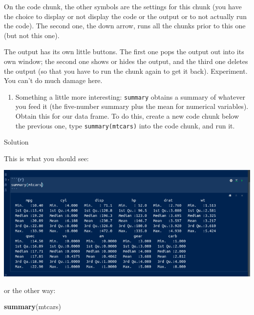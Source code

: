 \documentclass[]{tufte-book}
\newenvironment{Shaded}{}{}
\newcommand{\KeywordTok}[1]{\textcolor[rgb]{0.00,0.44,0.13}{\textbf{#1}}}
\newcommand{\NormalTok}[1]{#1}
\providecommand{\tightlist}{%
  \setlength{\itemsep}{0pt}\setlength{\parskip}{0pt}}
\theoremstyle{definition}
\theoremstyle{definition}
\theoremstyle{definition}
\theoremstyle{remark}
\begin{document}
On the code chunk, the other symbols are the settings for this chunk
(you have the choice to display or not display the code or the output or
to not actually run the code). The second one, the down arrow, runs all
the chunks prior to this one (but not this one).

The output has its own little buttons. The first one pops the output out
into its own window; the second one shows or hides the output, and the
third one deletes the output (so that you have to run the chunk again to
get it back). Experiment. You can't do much damage here.

\begin{enumerate}
\def\labelenumi{(\alph{enumi})}
\setcounter{enumi}{5}
\tightlist
\item
  Something a little more interesting: \texttt{summary} obtains a
  summary of whatever you feed it (the five-number summary plus the mean
  for numerical variables). Obtain this for our data frame. To do this,
  create a new code chunk below the previous one, type
  \texttt{summary(mtcars)} into the code chunk, and run it.
\end{enumerate}

Solution

This is what you should see:

\includegraphics{chunk4.png}

or the other way:

\begin{Shaded}
\begin{Highlighting}[]
\KeywordTok{summary}\NormalTok{(mtcars)}
\end{Highlighting}
\end{Shaded}
\end{document}

